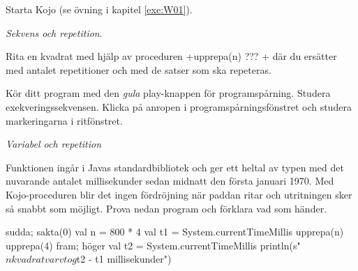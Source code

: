%
%

\vspace{1em}
\Task Starta Kojo (se övning {\tt \ExeWeekONE} i kapitel \ref{exe:W01}).


\Task \textit{Sekvens och repetition}.

\Subtask Rita en kvadrat med hjälp av proceduren \code+upprepa(n){ ??? }+ där du ersätter  med antalet repetitioner och  med de satser som ska repeteras.

\Subtask Kör ditt program med den \emph{gula} play-knappen för programspårning. Studera exekveringssekvensen. Klicka på anropen i programspårningsfönstret och studera markeringarna i ritfönstret.





\Task \textit{Variabel och repetition}

\Subtask Funktionen  ingår i Javas standardbibliotek och ger ett heltal av typen  med det nuvarande antalet millisekunder sedan midnatt den första januari 1970.  Med Kojo-proceduren  blir det ingen fördröjning när paddan ritar och utritningen sker så snabbt som möjligt. Prova nedan program och förklara vad som händer.
\begin{Code}
sudda; sakta(0)
val n = 800 * 4
val t1 = System.currentTimeMillis
upprepa(n){ upprepa(4){ fram; höger } }
val t2 = System.currentTimeMillis
println(s"$n kvadratvarv tog ${t2 - t1} millisekunder")
\end{Code}

